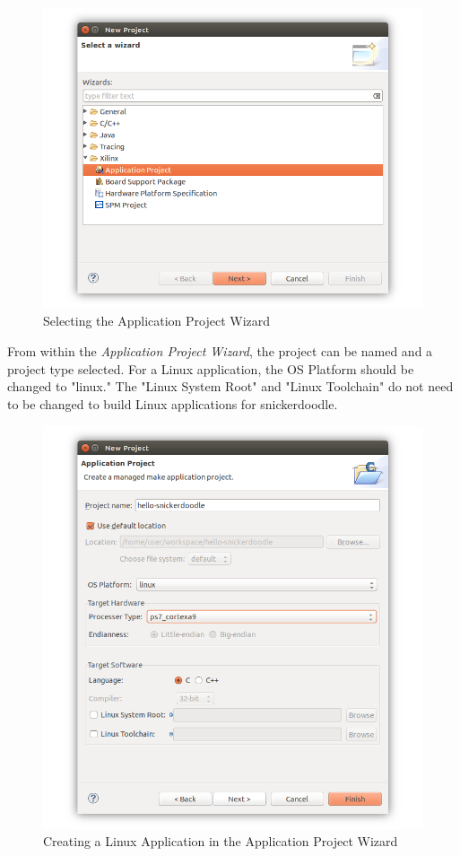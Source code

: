 \begin{figure}[h!]
	\centering
	\includegraphics{images/New_Application_Project.png}
	\caption[Selecting the Application Project Wizard]{Selecting the Application Project Wizard}
	\label{fig:newprojectwizard}
\end{figure}


\noindent
From within the \textit{Application Project Wizard}, the project can be named and a project type selected. For a Linux application, the OS Platform should be changed to "linux." The "Linux System Root" and "Linux Toolchain" do not need to be changed to build Linux applications for snickerdoodle. \\

\begin{figure}[h!]
	\centering
	\includegraphics{images/New_Linux_Project.png}
	\caption{Creating a Linux Application in the Application Project Wizard}
\end{figure}

